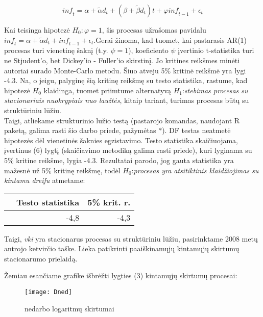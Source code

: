 \documentclass[a4paper]{article}
\begin{document}
\begin{equation}
\textit{inf}_t = \alpha + \tilde{\alpha} d_t + ( \beta + \tilde{\beta} d_t)t + \varphi\textit{inf}_{t-1} + \epsilon_t
\end{equation}

Kai teisinga hipotezė $H_0:\varphi=1$, šis procesas užrašomas pavidalu $\textit{inf}_t = \alpha + \tilde{\alpha} d_t + \textit{inf}_{t-1} + \epsilon_t$.Gerai žinoma, kad tuomet, kai pastarasis AR(1) procesas turi vienetinę šaknį (t.y. $\psi=1$), koeficiento $\psi$ įvertinio t-statistika turi ne Stjudent'o, bet Dickey'io - Fuller'io skirstinį. Jo kritines reikšmes minėti autoriai surado Monte-Carlo metodu. Šiuo atveju 5\% kritinė reikšmė yra lygi -4.3. Na, o jeigu, palyginę šią kritinę reikšmę su testo statistika, rastume, kad hipotezė $H_0$ klaidinga, tuomet priimtume alternatyvą $H_1$:\textit{stebimas procesas su stacionariais nuokrypiais nuo laužtės}, kitaip tariant, turimas procesas būtų su struktūriniu lūžiu.\\ \indent
Taigi, atliekame struktūrinio lūžio testą (pastarojo komandas, naudojant R paketą, galima rasti šio darbo priede, pažymėtas $*$). DF testas neatmetė hipotezės dėl vienetinės šaknies egzistavimo. Testo statistika skaičiuojama, įvertinus (6) lygtį (skaičiavimo metodiką galima rasti priede), kuri lyginama su 5\% kritine reikšme, lygia -4.3. Rezultatai parodo, jog gauta statistika yra mažesnė už 5\% kritinę reikšmę, todėl $H_0$:\textit{procesas yra atsitiktinis klaidžiojimas su kintamu dreifu} atmetame:

\begin{table}[!h]
\begin{center}
\begin{tabular}{rrr}
  \hline
 & Testo statistika & 5\% krit. r. \\ 
  \hline
 & -4,8 & -4,3 \\ 
   \hline
\end{tabular}
\end{center}
\end{table} \indent

Taigi, \textit{vki} yra stacionarus procesas su struktūriniu lūžiu, pasirinktame 2008 metų antrojo ketvirčio taške. Lieka patikrinti paaiškinamųjų kintamųjų skirtumų stacionarumo prielaidą.

Žemiau esančiame grafike išbrėžti lygties (3) kintamųjų skirtumų procesai:

\begin{figure}[h!]
\center
\texttt{[image: Dned]}
\caption{nedarbo logaritmų skirtumai}
\end{figure}\newpage
\end{document}
